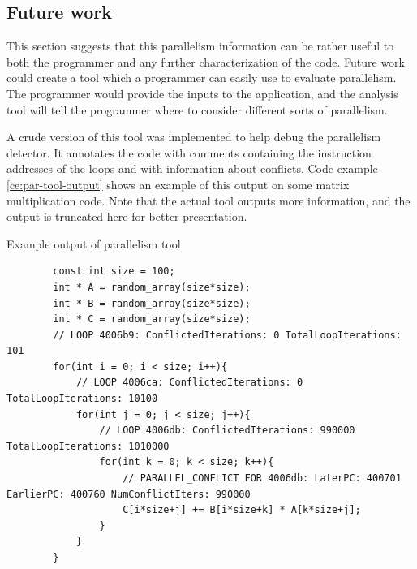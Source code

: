 \documentclass[12pt,twoside]{reedthesis}
\newenvironment{codeexample}[1][htb]
{\floatname{algorithm}{Code Example}%
	\begin{algorithm}[#1]%
	}{\end{algorithm}}
\begin{document}
		
		
		
		
		\subsection{Future work}
		\label{s:par-fut-work}
		
		This section suggests that this parallelism information can be rather useful to both the programmer and any further characterization of the code. Future work could create a tool which a programmer can easily use to evaluate parallelism. The programmer would provide the inputs to the application, and the analysis tool will tell the programmer where to consider different sorts of parallelism.
		
		A crude version of this tool was implemented to help debug the parallelism detector. It annotates the code with comments containing the instruction addresses of the loops and with information about conflicts. Code example \ref{ce:par-tool-output} shows an example of this output on some matrix multiplication code. Note that the actual tool outputs more information, and the output is truncated here for better presentation. 
		
		\begin{codeexample}
			\caption{Example output of parallelism tool}
			\label{ce:par-tool-output}
		\begin{verbatim}
		const int size = 100;
		int * A = random_array(size*size);
		int * B = random_array(size*size);
		int * C = random_array(size*size);
		// LOOP 4006b9: ConflictedIterations: 0 TotalLoopIterations: 101
		for(int i = 0; i < size; i++){
		    // LOOP 4006ca: ConflictedIterations: 0 TotalLoopIterations: 10100 
		    for(int j = 0; j < size; j++){
		        // LOOP 4006db: ConflictedIterations: 990000 TotalLoopIterations: 1010000
		        for(int k = 0; k < size; k++){
		            // PARALLEL_CONFLICT FOR 4006db: LaterPC: 400701 EarlierPC: 400760 NumConflictIters: 990000
		            C[i*size+j] += B[i*size+k] * A[k*size+j];
		        }
		    }
		}
		\end{verbatim}
		\end{codeexample}
		
\end{document}
